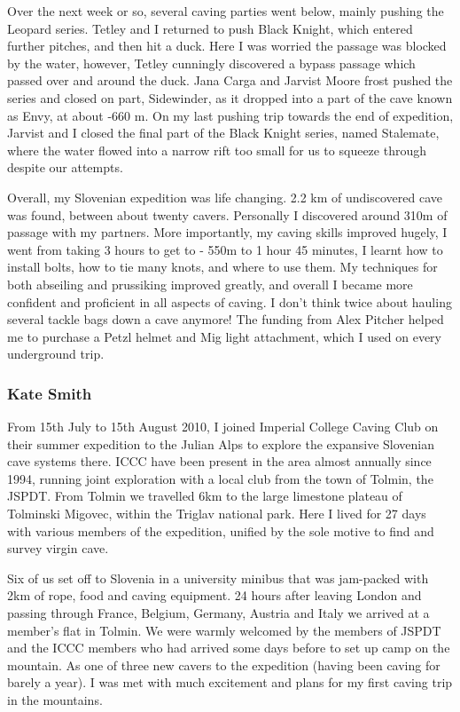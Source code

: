 Over the next week or so, several caving parties went below, mainly pushing the
Leopard series.  Tetley and I returned to push Black Knight, which entered
further pitches, and then hit a duck.  Here I was worried the passage was
blocked by the water, however, Tetley cunningly discovered a bypass passage
which passed over and around the duck.  Jana Carga and Jarvist Moore frost
pushed the series and closed on part, Sidewinder, as it dropped into a part of
the cave known as Envy, at about -660 m.  On my last pushing trip towards the
end of expedition, Jarvist and I closed the final part of the Black Knight
series, named Stalemate, where the water flowed into a narrow rift too small
for us to squeeze through despite our attempts.  

Overall, my Slovenian expedition was life changing.  2.2 km of undiscovered cave
was found, between about twenty cavers.  
Personally I discovered around 310m of passage with my partners.
More importantly, my caving skills improved hugely, I went from taking 3 hours
to get to - 550m to 1 hour 45 minutes, I learnt how to install bolts, how to tie
many knots, and where to use them.  My techniques for both abseiling and
prussiking improved greatly, and overall I became more confident and proficient
in all aspects of caving.  I don't think twice about hauling several tackle
bags down a cave anymore!  The funding from Alex Pitcher helped me to purchase
a Petzl helmet and Mig light attachment, which I used on every underground
trip.    

\subsubsection{Kate Smith}

From 15th July to 15th August 2010, I joined Imperial College Caving Club on
their summer expedition to the Julian Alps to explore the expansive Slovenian
cave systems there. ICCC have been present in the area almost annually since
1994, running joint exploration with a local club from the town of Tolmin, the
JSPDT. From Tolmin we travelled 6km to the large limestone plateau of Tolminski
Migovec, within the Triglav national park. Here I lived for 27 days with
various members of the expedition, unified by the sole motive to find and
survey virgin cave.

Six of us set off to Slovenia in a university minibus that was jam-packed with
2km of rope, food and caving equipment. 24 hours after leaving London and
passing through France, Belgium, Germany, Austria and Italy we arrived at a
member's flat in Tolmin. We were warmly welcomed by the members of JSPDT and
the ICCC members who had arrived some days before to set up camp on the
mountain. As one of three new cavers to the expedition (having been caving for
barely a year). I was met with much excitement and plans for my first caving
trip in the mountains.

